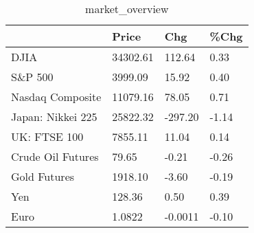 \documentclass{article}%
\begin{document}
%


\begin{table}[htbp]%
\caption{market\_overview}%
\centering%
\begin{adjustbox}{width=1\textwidth}%
\begin{tabular}{llll}
\toprule
                  &    Price &     Chg &  \%Chg \\
\midrule
             DJIA & 34302.61 &  112.64 &  0.33 \\
          S\&P 500 &  3999.09 &   15.92 &  0.40 \\
 Nasdaq Composite & 11079.16 &   78.05 &  0.71 \\
Japan: Nikkei 225 & 25822.32 & -297.20 & -1.14 \\
     UK: FTSE 100 &  7855.11 &   11.04 &  0.14 \\
Crude Oil Futures &    79.65 &   -0.21 & -0.26 \\
     Gold Futures &  1918.10 &   -3.60 & -0.19 \\
              Yen &   128.36 &    0.50 &  0.39 \\
             Euro &   1.0822 & -0.0011 & -0.10 \\
\bottomrule
\end{tabular}
%
\end{adjustbox}%
\end{table}

%
\end{document}
